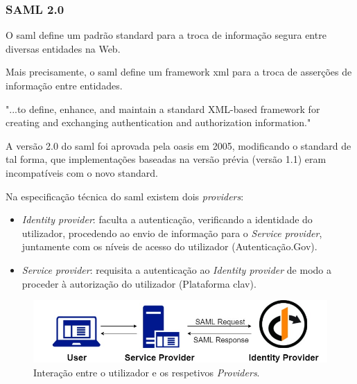 \cleardoublepage
\subsubsection{SAML 2.0} \label{saml_section}

O \gls{saml} define um padrão standard para a troca de informação segura entre diversas entidades na Web.

Mais precisamente, o \gls{saml} define um framework \gls{xml} para a troca de asserções de informação entre entidades. 

\begin{displayquote}
"...to define, enhance, and maintain a standard XML-based framework for creating and 
exchanging authentication and authorization information."
\\[5pt]
\end{displayquote}

A versão 2.0 do \gls{saml} foi aprovada pela \gls{oasis} em 2005, modificando o standard de tal forma, que implementações baseadas na versão prévia (versão 1.1) eram incompatíveis com o novo standard.

Na especificação técnica do \gls{saml} existem dois \emph{providers}:

\begin{itemize}
    \item \emph{Identity provider}: faculta a autenticação, verificando a identidade do utilizador, procedendo ao envio de informação para o \emph{Service provider}, juntamente com os níveis de acesso do utilizador (Autenticação.Gov).
    \item \emph{Service provider}: requisita a autenticação ao \emph{Identity provider} de modo a proceder à autorização do utilizador (Plataforma \gls{clav}).
\end{itemize}

\begin{figure}[h]
    \centering
    \includegraphics[width=\textwidth]{img/saml/samlproviders.jpg}
    \caption{Interação entre o utilizador e os respetivos \emph{Providers}. \cite{samlProviderPic}}
\end{figure}

